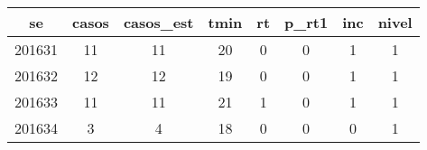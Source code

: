 \begin{tabular}{c|ccccccc}
  \hline
se & casos & casos\_est & tmin & rt & p\_rt1 & inc & nivel \\ 
  \hline
201631 & 11 & 11 & 20 & 0 & 0 & 1 & 1 \\ 
  201632 & 12 & 12 & 19 & 0 & 0 & 1 & 1 \\ 
  201633 & 11 & 11 & 21 & 1 & 0 & 1 & 1 \\ 
  201634 & 3 & 4 & 18 & 0 & 0 & 0 & 1 \\ 
   \hline
\end{tabular}
